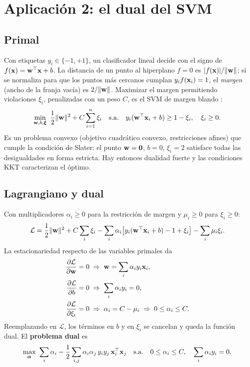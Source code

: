\section{Aplicación 2: el dual del SVM}
\label{sec:svm_dual}

\subsection{Primal}

Con etiquetas $y_i \in \{-1, +1\}$, un clasificador lineal decide con el signo de $f(\mathbf{x}) = \mathbf{w}^\top\mathbf{x} + b$. La
distancia de un punto al hiperplano $f = 0$ es $|f(\mathbf{x})|/\lVert\mathbf{w}\rVert$; si se normaliza para que los puntos más
cercanos cumplan $y_i f(\mathbf{x}_i) = 1$, el \emph{margen} (ancho de la franja vacía) es $2/\lVert\mathbf{w}\rVert$. Maximizar el
margen permitiendo violaciones $\xi_i$, penalizadas con un peso $C$, es el SVM de margen blando
\parencite{cortes1995}:
\begin{equation}
  \min_{\mathbf{w}, b, \boldsymbol\xi}\ \frac12\lVert\mathbf{w}\rVert^2 + C\sum_{i=1}^n\xi_i
  \quad\text{s.a.}\quad y_i(\mathbf{w}^\top\mathbf{x}_i + b) \ge 1 - \xi_i,\quad \xi_i \ge 0.
  \label{eq:svm_primal}
\end{equation}
Es un problema convexo (objetivo cuadrático convexo, restricciones afines) que cumple la condición de Slater:
el punto $\mathbf{w} = \mathbf{0}$, $b = 0$, $\xi_i = 2$ satisface todas las desigualdades en forma estricta. Hay entonces
dualidad fuerte y las condiciones KKT caracterizan el óptimo.

\subsection{Lagrangiano y dual}

Con multiplicadores $\alpha_i \ge 0$ para la restricción de margen y $\mu_i \ge 0$ para $\xi_i \ge 0$:
\begin{equation}
  \mathcal{L} = \frac12\lVert\mathbf{w}\rVert^2 + C\sum_i\xi_i - \sum_i\alpha_i\big[y_i(\mathbf{w}^\top\mathbf{x}_i + b) - 1 + \xi_i\big] - \sum_i\mu_i\xi_i.
\end{equation}
La estacionariedad respecto de las variables primales da
\begin{align}
  \frac{\partial\mathcal{L}}{\partial\mathbf{w}} = 0 &\;\Rightarrow\; \mathbf{w} = \sum_i\alpha_i y_i\mathbf{x}_i, \label{eq:svm_w}\\
  \frac{\partial\mathcal{L}}{\partial b} = 0 &\;\Rightarrow\; \sum_i\alpha_i y_i = 0, \\
  \frac{\partial\mathcal{L}}{\partial\xi_i} = 0 &\;\Rightarrow\; \alpha_i = C - \mu_i \;\Rightarrow\; 0 \le \alpha_i \le C.
\end{align}
Reemplazando en $\mathcal{L}$, los términos en $b$ y en $\xi_i$ se cancelan y queda la función dual. El
\textbf{problema dual} es
\begin{equation}
  \max_{\boldsymbol\alpha}\ \sum_i\alpha_i - \frac12\sum_{i,j}\alpha_i\alpha_j\,y_i y_j\,\mathbf{x}_i^\top\mathbf{x}_j
  \quad\text{s.a.}\quad 0 \le \alpha_i \le C,\quad \sum_i\alpha_i y_i = 0.
  \label{eq:svm_dual}
\end{equation}

